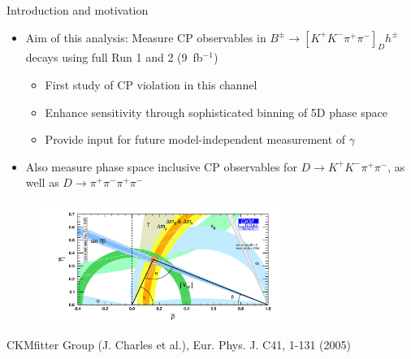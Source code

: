 \documentclass{beamer}
\begin{document}
\begin{frame}{Introduction and motivation}
  \begin{itemize}
    \setlength\itemsep{0.0em}
    \item{Aim of this analysis: Measure CP observables in $B^\pm\to[K^+K^-\pi^+\pi^-]_D h^\pm$ decays using full Run 1 and 2 ($9$~fb$^{-1}$)}
    \begin{itemize}
      \setlength\itemsep{0.5em}
      \item{First study of CP violation in this channel}
      \item{Enhance sensitivity through sophisticated binning of 5D phase space}
      \item{Provide input for future model-independent measurement of $\gamma$}
    \end{itemize}
    \item{Also measure phase space inclusive CP observables for $D\to K^+K^-\pi^+\pi^-$, as well as $D\to\pi^+\pi^-\pi^+\pi^-$}
  \end{itemize}
  \vspace{-0.2cm}
  \begin{figure}
    \includegraphics[width = 0.70\textwidth]{Plots/ckmfitter2.png}
  \end{figure}
  \vspace{-0.5cm}
  \begin{center}
    \tiny{CKMfitter Group (J. Charles et al.), Eur. Phys. J. C41, 1-131 (2005)}
  \end{center}
\end{frame}
\end{document}
